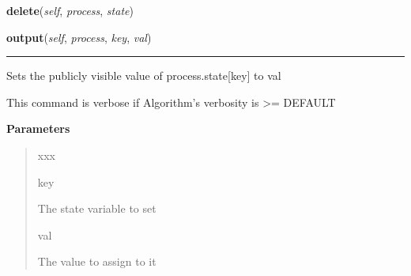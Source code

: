 \hspace{.8\funcindent}\begin{boxedminipage}{\funcwidth}

    \raggedright \textbf{delete}(\textit{self}, \textit{process}, \textit{state})

\setlength{\parskip}{2ex}
\setlength{\parskip}{1ex}
    \end{boxedminipage}

    \label{datk:core:distalgs:Algorithm:output}

    \vspace{0.5ex}

\hspace{.8\funcindent}\begin{boxedminipage}{\funcwidth}

    \raggedright \textbf{output}(\textit{self}, \textit{process}, \textit{key}, \textit{val})

    \vspace{-1.5ex}

    \rule{\textwidth}{0.5\fboxrule}
\setlength{\parskip}{2ex}
    Sets the publicly visible value of process.state[key] to val

    This command is verbose if Algorithm's verbosity is {\textgreater}= 
    DEFAULT

\setlength{\parskip}{1ex}
      \textbf{Parameters}
      \vspace{-1ex}

      \begin{quote}
        \begin{Ventry}{xxx}

          \item[key]

          The state variable to set

          \item[val]

          The value to assign to it

        \end{Ventry}

      \end{quote}

    \end{boxedminipage}



